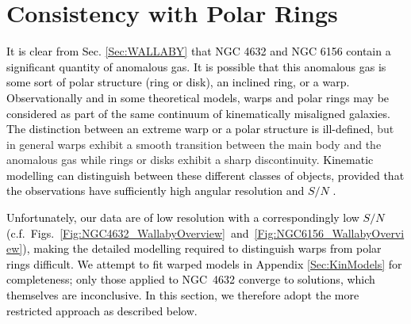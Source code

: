 \documentclass[fleqn,usenatbib]{mnras}
\newcommand{\hi}{\text{H\,\sc{i}}}
\newcommand{\Msol}{\textrm{M}_{\odot}}
\newcommand{\KS}[1]{\textcolor{black}{#1}}
\begin{document}


\section{Consistency with Polar Rings}\label{Sec:PRGConsistency}

\textcolor{black}{It is clear from Sec. \ref{Sec:WALLABY} that NGC 4632 and NGC 6156 contain a significant quantity of anomalous gas.  It is possible that this anomalous gas is some sort of polar structure (ring or disk), an inclined ring, or a warp.  
\textcolor{black}{Observationally and in some theoretical models,} warps and polar rings may be considered as part of the same continuum of kinematically misaligned galaxies.}
\textcolor{black}{The distinction between an extreme warp or a polar structure is ill-defined,} but in general warps exhibit a smooth transition between the main body and the anomalous gas while rings or disks exhibit a sharp discontinuity. \textcolor{black}{Kinematic modelling can distinguish between these different classes of objects, provided that the observations have sufficiently high angular resolution and $S/N$ \citep{Jorza2009, Arnaboldi1997}.} 

\KS{Unfortunately, our data are of low resolution with a correspondingly low $S/N$ (c.f.\ Figs.~\ref{Fig:NGC4632_WallabyOverview}~and~\ref{Fig:NGC6156_WallabyOverview}), making the detailed modelling required to distinguish warps from polar rings difficult. We attempt to fit warped models in Appendix \ref{Sec:KinModels} for completeness; only those applied to NGC~4632 converge to solutions, which themselves are inconclusive. In this section, we therefore adopt the more restricted approach as described below.}
\end{document}
